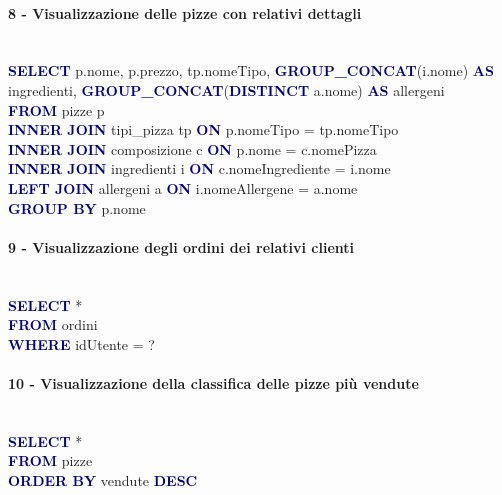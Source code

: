 \documentclass[a4paper,12pt, oneside]{article}
\begin{document}
\paragraph{8 - Visualizzazione delle pizze con relativi dettagli}
\hphantom{A}\\    %
\textcolor{darkBlue}{\textbf{SELECT}} p.nome, p.prezzo, tp.nomeTipo, \textcolor{darkBlue}{\textbf{GROUP\_CONCAT}}(i.nome) \textcolor{darkBlue}{\textbf{AS}} ingredienti, \textcolor{darkBlue}{\textbf{GROUP\_CONCAT}}(\textcolor{darkBlue}{\textbf{DISTINCT}} a.nome) \textcolor{darkBlue}{\textbf{AS}} allergeni
\\\textcolor{darkBlue}{\textbf{FROM}} pizze p
\\\textcolor{darkBlue}{\textbf{INNER JOIN}} tipi\_pizza tp \textcolor{darkBlue}{\textbf{ON}} p.nomeTipo = tp.nomeTipo
\\\textcolor{darkBlue}{\textbf{INNER JOIN}} composizione c \textcolor{darkBlue}{\textbf{ON}} p.nome = c.nomePizza
\\\textcolor{darkBlue}{\textbf{INNER JOIN}} ingredienti i \textcolor{darkBlue}{\textbf{ON}} c.nomeIngrediente = i.nome
\\\textcolor{darkBlue}{\textbf{LEFT JOIN}} allergeni a \textcolor{darkBlue}{\textbf{ON}} i.nomeAllergene = a.nome
\\\textcolor{darkBlue}{\textbf{GROUP BY}} p.nome

\paragraph{9 - Visualizzazione degli ordini dei relativi clienti}
\hphantom{A}\\    %
\textcolor{darkBlue}{\textbf{SELECT}} *
\\\textcolor{darkBlue}{\textbf{FROM}} ordini
\\\textcolor{darkBlue}{\textbf{WHERE}} idUtente = ?

\paragraph{10 - Visualizzazione della classifica delle pizze più vendute}
\hphantom{A}\\    %
\textcolor{darkBlue}{\textbf{SELECT}} *
\\\textcolor{darkBlue}{\textbf{FROM}} pizze
\\\textcolor{darkBlue}{\textbf{ORDER BY}} vendute \textcolor{darkBlue}{\textbf{DESC}}
\end{document}
